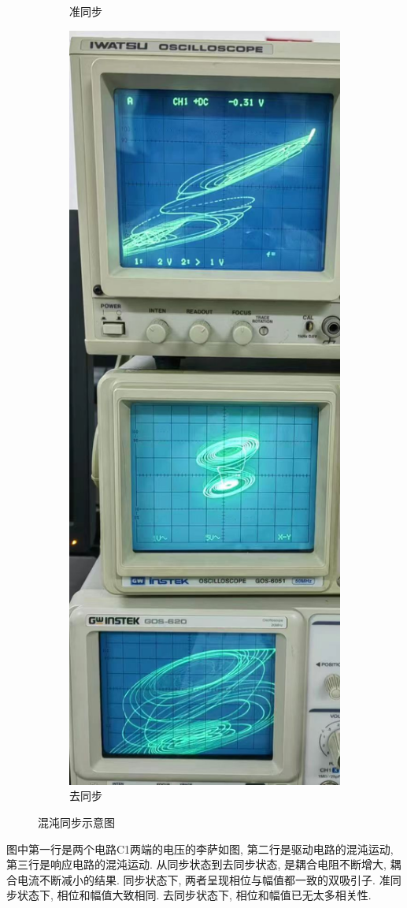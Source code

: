 \documentclass[12pt,a4paper]{article}
\begin{document}
\begin{figure}[H]
\begin{subfigure}[b]{0.3\textwidth}
      \caption{准同步}
    \end{subfigure}
    \hfill
    \begin{subfigure}[b]{0.3\textwidth}
      \centering
      \includegraphics[width=\textwidth]{去同步.jpg}
      \caption{去同步}
    \end{subfigure}
    \caption{混沌同步示意图}
\end{figure}
图中第一行是两个电路C1两端的电压的李萨如图, 第二行是驱动电路的混沌运动, 第三行是响应电路的混沌运动. 
从同步状态到去同步状态, 是耦合电阻不断增大, 耦合电流不断减小的结果. 同步状态下, 两者呈现相位与幅值都一致的双吸引子. 准同步状态下, 相位和幅值大致相同. 去同步状态下, 相位和幅值已无太多相关性. 
\end{document}
